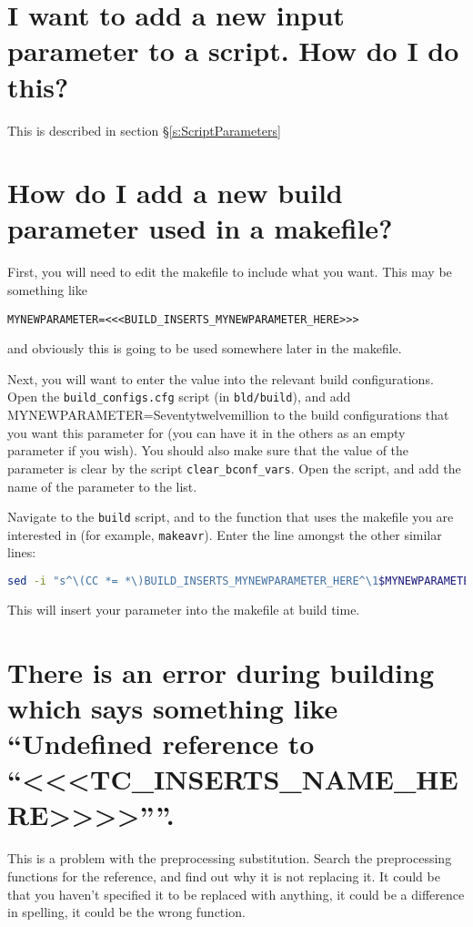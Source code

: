 \documentclass[a4paper, oneside, 11pt, titlepage, onecolumn, openright]{report}
\begin{document}
{\section{I want to add a new input parameter to a script. How do I do this?}
			\label{s:FAQNewParams}
			This is described in section \S\ref{s:ScriptParameters}
			
\section{How do I add a new build parameter used in a makefile?}
			\label{s:FAQNewMakeParams}
			First, you will need to edit the makefile to include what you want. This may be something like
			
\begin{lstlisting}[frame=trBL, breaklines=true]
MYNEWPARAMETER=<<<BUILD_INSERTS_MYNEWPARAMETER_HERE>>>
\end{lstlisting}			

			and obviously this is going to be used somewhere later in the makefile.\newline
			
			Next, you will want to enter the value into the relevant build configurations. Open the \texttt{build\_configs.cfg} script (in \texttt{bld/build}), and add MYNEWPARAMETER=Seventytwelvemillion to the build configurations that you want this parameter for (you can have it in the others as an empty parameter if you wish).
			You should also make sure that the value of the parameter is clear by the script \texttt{clear\_bconf\_vars}. Open the script, and add the name of the parameter to the list.\newline
			
			Navigate to the \texttt{build} script, and to the function that uses the makefile you are interested in (for example, \texttt{makeavr}).
			Enter the line amongst the other similar lines:
\begin{lstlisting}[frame=trBL, breaklines=true, language=bash]			
sed -i "s^\(CC *= *\)BUILD_INSERTS_MYNEWPARAMETER_HERE^\1$MYNEWPARAMETER^" $TCPATH/$TMP_SRC_DIR/${COMPONENT}/Makefile 
\end{lstlisting}				

This will insert your parameter into the makefile at build time.

\section{There is an error during building which says something like ``Undefined reference to ``<<<TC\_INSERTS\_NAME\_HERE>>>>''''.}
			\label{s:FAQUndefinedError}
			This is a problem with the preprocessing substitution. Search the preprocessing functions for the reference, and find out why it is not replacing it. It could be that you haven't specified it to be replaced with anything, it could be a difference in spelling, it could be the wrong function.
			
}
\end{document}
